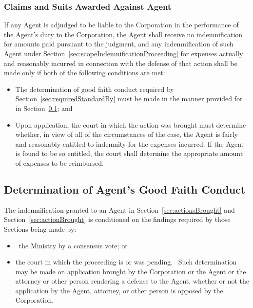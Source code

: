 \documentclass[letterpaper,titlepage]{article}
\begin{document}
\subsubsection{Claims and Suits Awarded Against Agent}
\label{sec:claimsSuits}
If any Agent is adjudged to be liable to the Corporation in the performance of
the Agent's duty to the Corporation, the Agent shall receive no indemnification
for amounts paid pursuant to the judgment, and any indemnification of such
Agent under Section~\ref{sec:scopeIndemnificationProceeding} for expenses actually and reasonably incurred in connection with the defense of that action shall be made only if both of the following conditions are met:
\begin{itemize}
    \item[(1)] The determination of good faith conduct required by
        Section~\ref{sec:requiredStandardBy} must be made in the manner provided
        for in Section~\ref{sec:determinationAgent}; and
    \item[(2)] Upon application, the court in which the action was brought must
        determine whether, in view of all of the circumstances of the case, the
        Agent is fairly and reasonably entitled to indemnity for the expenses
        incurred. If the Agent is found to be so entitled, the court shall
        determine the appropriate amount of expenses to be reimbursed.
\end{itemize}

\subsection{Determination of Agent's Good Faith Conduct}
\label{sec:determinationAgent}
The indemnification granted to an Agent in Section~\ref{sec:actionsBrought} and Section~\ref{sec:actionBrought} is conditioned on the findings required by those Sections being made by:
\begin{itemize}
    \item[(1)] the Ministry by a consensus vote; or
    \item[(2)] the court in which the proceeding is or was pending.  Such determination may be made on application brought by the Corporation or the Agent or the attorney or other person rendering a defense to the Agent, whether or not the application by the Agent, attorney, or other person is opposed by the Corporation.
\end{itemize} 
\end{document}
